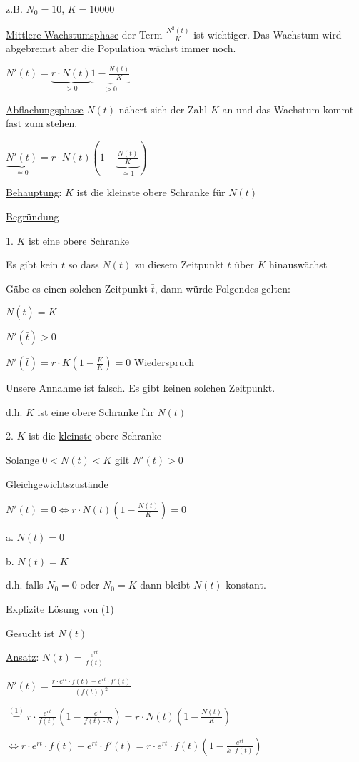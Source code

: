 \documentclass[18pt,a4paper]{scrreprt}
\begin{document}
z.B. $N_0 = 10$, $K = 10000$

\uline{Mittlere Wachstumsphase} der Term $\frac{N^2(t)}{K}$ ist wichtiger. Das Wachstum wird abgebremst aber die Population wächst immer noch.

$N'(t) = \underbrace{r\cdot N(t)}_{>0} \underbrace{1-\frac{N(t)}{K}}_{>0}$

\uline{Abflachungsphase} $N(t)$ nähert sich der Zahl $K$ an und das Wachstum kommt fast zum stehen. 

$\underbrace{N'(t)}_{\simeq 0} = r\cdot N(t) (1-\underbrace{\frac{N(t)}{K}}_{\simeq 1})$ 

\uline{Behauptung}: $K$ ist die kleinste obere Schranke für $N(t)$

\uline{Begründung}

1. $K$ ist eine obere Schranke

Es gibt kein $\bar{t}$ so dass $N(t)$ zu diesem Zeitpunkt $\bar{t}$ über $K$ hinauswächst

Gäbe es einen solchen Zeitpunkt $\bar{t}$, dann würde Folgendes gelten:

$N(\bar{t}) = K$

$N'(\bar{t}) > 0$

$N'(\bar{t}) = r\cdot K (1-\frac{K}{K}) = 0$ Wiederspruch

Unsere Annahme ist falsch. Es gibt keinen solchen Zeitpunkt.

d.h. $K$ ist eine obere Schranke für $N(t)$

2. $K$ ist die \uline{kleinste} obere Schranke

Solange $0<N(t)<K$ gilt $N'(t)> 0$

\uline{Gleichgewichtszustände}

$N'(t) = 0 \Leftrightarrow r\cdot N(t) (1-\frac{N(t)}{K}) =0$

a. $N(t) = 0$

b. $N(t) = K$

d.h. falls $N_0 =0$ oder $N_0 = K$ dann bleibt $N(t)$ konstant.

\uline{Explizite Lösung von (1)}

Gesucht ist $N(t)$

\uline{Ansatz}: $N(t) = \frac{e^{rt}}{f(t)}$

$N'(t) = \frac{r\cdot e^{rt}\cdot f(t) - e^{rt} \cdot f'(t)}{(f(t))^2}$

$\stackrel{(1)}{=} r\cdot \frac{e^{rt}}{f(t)}(1-\frac{e^{rt}}{f(t)\cdot K})=r\cdot N(t)(1-\frac{N(t)}{K})$

$\Leftrightarrow r\cdot e^{rt} \cdot f(t) - e^{rt} \cdot f'(t) = r\cdot e^{rt} \cdot f(t) (1-\frac{e^{rt}}{k\cdot f(t)})$
\end{document}
